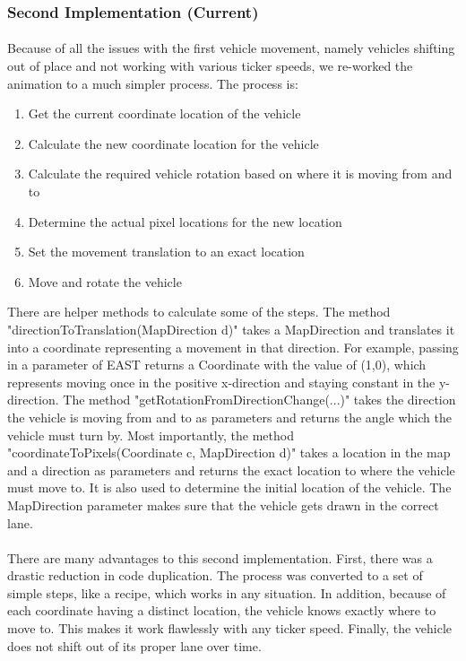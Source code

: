 \documentclass[a4paper,11pt,titlepage]{article}
\begin{document}
\subsubsection{Second Implementation (Current)}
\paragraph{}
Because of all the issues with the first vehicle movement, namely vehicles shifting out of place and not working with various ticker speeds, we re-worked the animation to a much simpler process. The process is:
\begin{enumerate}\itemsep1pt \parskip0pt 
\item Get the current coordinate location of the vehicle
\item Calculate the new coordinate location for the vehicle
\item Calculate the required vehicle rotation based on where it is moving from and to
\item Determine the actual pixel locations for the new location
\item Set the movement translation to an exact location
\item Move and rotate the vehicle
\end{enumerate}
There are helper methods to calculate some of the steps. The method "directionToTranslation(MapDirection d)" takes a MapDirection and translates it into a coordinate representing a movement in that direction. For example, passing in a parameter of EAST returns a Coordinate with the value of (1,0), which represents moving once in the positive x-direction and staying constant in the y-direction. The method "getRotationFromDirectionChange(...)" takes the direction the vehicle is moving from and to as parameters and returns the angle which the vehicle must turn by. Most importantly, the method "coordinateToPixels(Coordinate c, MapDirection d)" takes a location in the map and a direction as parameters and returns the exact location to where the vehicle must move to. It is also used to determine the initial location of the vehicle. The MapDirection parameter makes sure that the vehicle gets drawn in the correct lane.

\paragraph{}
There are many advantages to this second implementation. First, there was a drastic reduction in code duplication. The process was converted to a set of simple steps, like a recipe, which works in any situation. In addition, because of each coordinate having a distinct location, the vehicle knows exactly where to move to. This makes it work flawlessly with any ticker speed. Finally, the vehicle does not shift out of its proper lane over time. 
\end{document}
